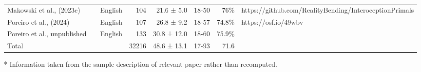 \begin{table}[!t]
\begin{tabular*}{\linewidth}{@{\extracolsep{\fill}}lllrrrrl}
Makowski et al., (2023c) &  & English & 104 & 21.6 ± 5.0 & 18-50 & 76\% & https://github.com/RealityBending/InteroceptionPrimals \\ 
Poreiro et al., (2024) &  & English & 107 & 26.8 ± 9.2 & 18-57 & 74.8\% & https://osf.io/49wbv \\ 
Poreiro et al., unpublished &  & English & 133 & 30.8 ± 12.0 & 18-60 & 75.9\% &  \\ 
Total &  &  & 32216 & 48.6 ± 13.1 & 17-93 & 71.6 &  \\ 
\bottomrule
\end{tabular*}
\begin{minipage}{\linewidth}
* Information taken from the sample description of relevant paper rather than recomputed.\\
\end{minipage}
\end{table}

